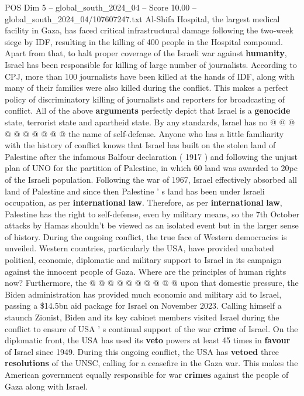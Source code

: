 \begin{textsample}{POS Dim 5 – global\_south\_2024\_04 – Score 10.00 – global\_south\_2024\_04/107607247.txt}
Al-Shifa Hospital, the largest medical facility in Gaza, has faced critical infrastructural damage following the two-week siege by IDF, resulting in the killing of 400 people in the Hospital compound.
Apart from that, to halt proper coverage of the Israeli war against \textbf{humanity}, Israel has been responsible for killing of large number of journalists.
According to CPJ, more than 100 journalists have been killed at the hands of IDF, along with many of their families were also killed during the conflict.
This makes a perfect policy of discriminatory killing of journalists and reporters for broadcasting of conflict.
All of the above \textbf{arguments} perfectly depict that Israel is a \textbf{genocide} state, terrorist state and apartheid state.
By any standards, Israel has no @ @ @ @ @ @ @ @ @ @ the name of self-defense.
Anyone who has a little familiarity with the history of conflict knows that Israel has built on the stolen land of Palestine after the infamous Balfour declaration ( 1917 ) and following the unjust plan of UNO for the partition of Palestine, in which 60 land was awarded to 20pc of the Israeli population.
Following the war of 1967, Israel effectively absorbed all land of Palestine and since then Palestine ' s land has been under Israeli occupation, as per \textbf{international} \textbf{law}.
Therefore, as per \textbf{international} \textbf{law}, Palestine has the right to self-defense, even by military means, so the 7th October attacks by Hamas shouldn't be viewed as an isolated event but in the larger sense of history.
During the ongoing conflict, the true face of Western democracies is unveiled.
Western countries, particularly the USA, have provided unabated political, economic, diplomatic and military support to Israel in its campaign against the innocent people of Gaza.
Where are the principles of human rights now?
Furthermore, the @ @ @ @ @ @ @ @ @ @ upon that domestic pressure, the Biden administration has provided much economic and military aid to Israel, passing a \$14.5bn aid package for Israel on November 2023.
Calling himself a staunch Zionist, Biden and its key cabinet members visited Israel during the conflict to ensure of USA ' s continual support of the war \textbf{crime} of Israel.
On the diplomatic front, the USA has used its \textbf{veto} powers at least 45 times in \textbf{favour} of Israel since 1949.
During this ongoing conflict, the USA has \textbf{vetoed} three \textbf{resolutions} of the UNSC, calling for a ceasefire in the Gaza war.
This makes the American government equally responsible for war \textbf{crimes} against the people of Gaza along with Israel.

\end{textsample}
